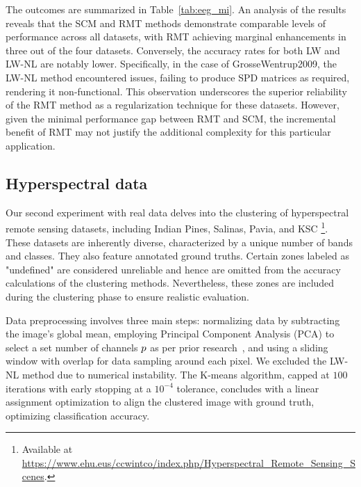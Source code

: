 \documentclass{article}
\theoremstyle{plain}
\theoremstyle{definition}
\theoremstyle{remark}
\begin{document}

The outcomes are summarized in Table~\ref{tab:eeg_mi}. An analysis of the results reveals that the SCM and RMT methods demonstrate comparable levels of performance across all datasets, with RMT achieving marginal enhancements in three out of the four datasets. Conversely, the accuracy rates for both LW and LW-NL are notably lower. Specifically, in the case of GrosseWentrup2009, the LW-NL method encountered issues, failing to produce SPD matrices as required, rendering it non-functional. This observation underscores the superior reliability of the RMT method as a regularization technique for these datasets. However, given the minimal performance gap between RMT and SCM, the incremental benefit of RMT may not justify the additional complexity for this particular application.

\subsection{Hyperspectral data}





Our second experiment with real data delves into the clustering of hyperspectral remote sensing datasets, including Indian Pines, Salinas, Pavia, and KSC%
\footnote{
    Available at \url{https://www.ehu.eus/ccwintco/index.php/Hyperspectral_Remote_Sensing_Scenes}.
}.
 These datasets are inherently diverse, characterized by a unique number of bands and classes. They also feature annotated ground truths. Certain zones labeled as "undefined" are considered unreliable and hence are omitted from the accuracy calculations of the clustering methods. Nevertheless, these zones are included during the clustering phase to ensure realistic evaluation. 

 Data preprocessing involves three main steps: normalizing data by subtracting the image's global mean, employing Principal Component Analysis (PCA) to select a set number of channels $p$ as per prior research~\cite{9627641}, and using a sliding window with overlap for data sampling around each pixel. We excluded the LW-NL method due to numerical instability. The K-means algorithm, capped at $100$ iterations with early stopping at a $10^{-4}$ tolerance, concludes with a linear assignment optimization to align the clustered image with ground truth, optimizing classification accuracy.
 
\end{document}
